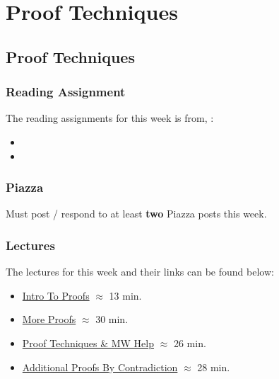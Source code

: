 \clearpage

\renewcommand{\ChapTitle}{Proof Techniques}
\renewcommand{\SectionTitle}{Proof Techniques}

\chapter{\ChapTitle}
\section{\SectionTitle}

\subsection{Reading Assignment}

The reading assignments for this week is from, \Textbook:

\begin{itemize}
    \item {}
    \item {}
\end{itemize}

\subsection{Piazza}

Must post / respond to at least \textbf{two} Piazza posts this week.

\subsection{Lectures}

The lectures for this week and their links can be found below:

\begin{itemize}
    \item \href{https://drive.explaineverything.com/thecode/TREJHHM}{Intro To Proofs} $\approx$ 13 min.
    \item \href{https://drive.explaineverything.com/thecode/YNUCFDU}{More Proofs} $\approx$ 30 min.
    \item \href{https://drive.explaineverything.com/thecode/UAQXMXM}{Proof Techniques \& MW Help} $\approx$ 26 min.
    \item \href{https://applied.cs.colorado.edu/mod/hvp/view.php?id=51592}{Additional Proofs By Contradiction} $\approx$ 28 min.
\end{itemize}

